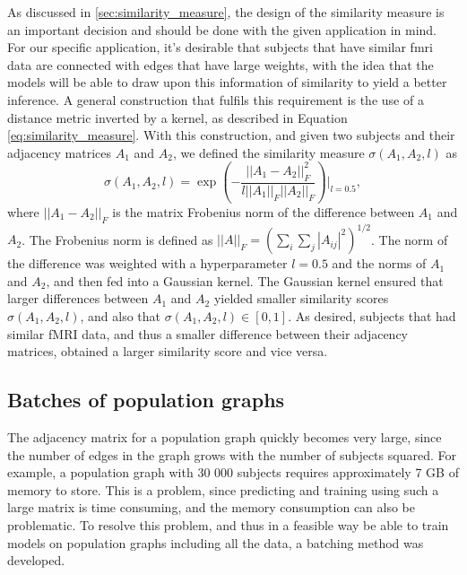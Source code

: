 As discussed in \cref{sec:similarity_measure}, the design of the similarity measure is an important decision and should be done with the given application in mind. For our specific application, it's desirable that subjects that have similar \acrshort{fmri} data are connected with edges that have large weights, with the idea that the models will be able to draw upon this information of similarity to yield a better inference. A general construction that fulfils this requirement is the use of a distance metric inverted by a kernel, as described in Equation \eqref{eq:similarity_measure}. With this construction, and given two subjects and their adjacency matrices $A_1$ and $A_2$, we defined the similarity measure $\sigma\left(A_1, A_2, l\right)$ as
\begin{equation}
    \sigma\left(A_1, A_2, l\right) = \exp{\left(- \frac{||A_1 - A_2||_F^2}{l||A_1||_F ||A_2||_F} \right)}\biggr\rvert_{l=0.5},
    \label{eq:modified_similarity_measure}
\end{equation}
where $||A_1 - A_2 ||_F$ is the matrix Frobenius norm of the difference between $A_1$ and $A_2$. The Frobenius norm is defined as $||A||_F = \left( \sum_i \sum_j |A_{ij}|^2 \right)^{1/2}$. The norm of the difference was weighted with a hyperparameter $l=0.5$ and the norms of $A_1$ and $A_2$, and then fed into a Gaussian kernel. The Gaussian kernel ensured that larger differences between $A_1$ and $A_2$ yielded smaller similarity scores $\sigma\left(A_1, A_2, l\right)$, and also that  $\sigma\left(A_1, A_2, l\right) \in \left[0, 1\right]$. As desired, subjects that had similar fMRI data, and thus a smaller difference between their adjacency matrices, obtained a larger similarity score and vice versa. 


\subsection{Batches of population graphs}
The adjacency matrix for a population graph quickly becomes very large, since the number of edges in the graph grows with the number of subjects squared. For example, a population graph with 30 000 subjects requires approximately 7 GB of memory to store. This is a problem, since predicting and training using such a large matrix is time consuming, and the memory consumption can also be problematic. To resolve this problem, and thus in a feasible way be able to train models on population graphs including all the data, a batching method was developed. 

